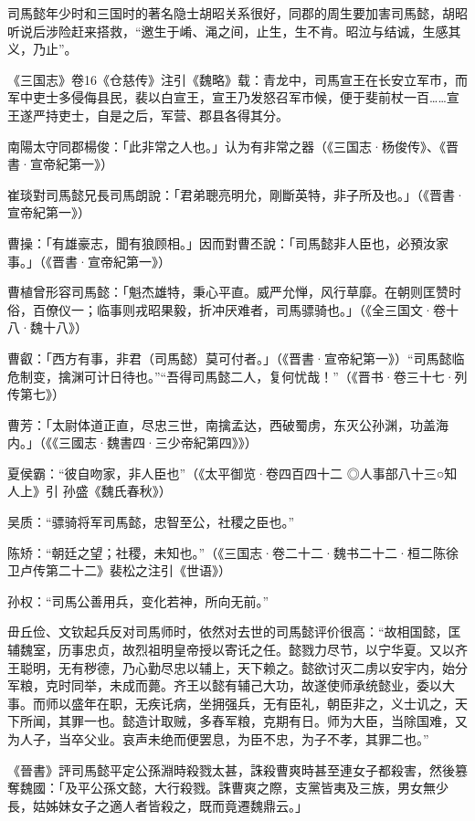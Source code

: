 司馬懿年少时和三国时的著名隐士胡昭关系很好，同郡的周生要加害司馬懿，胡昭听说后涉险赶来搭救，“邀生于崤、渑之间，止生，生不肯。昭泣与结诚，生感其义，乃止”。

《三国志》卷16《仓慈传》注引《魏略》载：青龙中，司馬宣王在长安立军市，而军中吏士多侵侮县民，裴以白宣王，宣王乃发怒召军市候，便于斐前杖一百……宣王遂严持吏士，自是之后，军营、郡县各得其分。

南陽太守同郡楊俊：「此非常之人也。」认为有非常之器（《三国志·杨俊传》、《晋書·宣帝紀第一》）

崔琰對司馬懿兄長司馬朗說：「君弟聰亮明允，剛斷英特，非子所及也。」（《晋書·宣帝紀第一》）

曹操：「有雄豪志，聞有狼顾相。」因而對曹丕說：「司馬懿非人臣也，必預汝家事。」（《晋書·宣帝紀第一》）

曹植曾形容司馬懿：「魁杰雄特，秉心平直。威严允惮，风行草靡。在朝则匡赞时俗，百僚仪一；临事则戎昭果毅，折冲厌难者，司馬骠骑也。」（《全三国文·卷十八·魏十八》）

曹叡：「西方有事，非君（司馬懿）莫可付者。」（《晋書·宣帝紀第一》）“司馬懿临危制变，擒渊可计日待也。”“吾得司馬懿二人，复何忧哉！”（《晋书·卷三十七·列传第七》）

曹芳：「太尉体道正直，尽忠三世，南擒孟达，西破蜀虏，东灭公孙渊，功盖海内。」（《《三國志·魏書四·三少帝紀第四》》）

夏侯霸：“彼自吻家，非人臣也”（《太平御览·卷四百四十二 ◎人事部八十三○知人上》引 孙盛《魏氏春秋》）

吴质：“骠骑将军司馬懿，忠智至公，社稷之臣也。”

陈矫：“朝廷之望；社稷，未知也。”（《三国志·卷二十二·魏书二十二·桓二陈徐卫卢传第二十二》裴松之注引《世语》）

孙权：“司馬公善用兵，变化若神，所向无前。”

毌丘俭、文钦起兵反对司馬师时，依然对去世的司馬懿评价很高：“故相国懿，匡辅魏室，历事忠贞，故烈祖明皇帝授以寄讬之任。懿戮力尽节，以宁华夏。又以齐王聪明，无有秽德，乃心勤尽忠以辅上，天下赖之。懿欲讨灭二虏以安宇内，始分军粮，克时同举，未成而薨。齐王以懿有辅己大功，故遂使师承统懿业，委以大事。而师以盛年在职，无疾讬病，坐拥强兵，无有臣礼，朝臣非之，义士讥之，天下所闻，其罪一也。懿造计取贼，多舂军粮，克期有日。师为大臣，当除国难，又为人子，当卒父业。哀声未绝而便罢息，为臣不忠，为子不孝，其罪二也。”

《晉書》評司馬懿平定公孫淵時殺戮太甚，誅殺曹爽時甚至連女子都殺害，然後篡奪魏國：「及平公孫文懿，大行殺戮。誅曹爽之際，支黨皆夷及三族，男女無少長，姑姊妹女子之適人者皆殺之，既而竟遷魏鼎云。」

